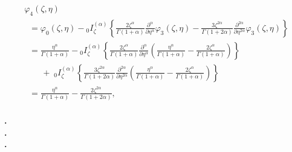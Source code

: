 \documentclass[10pt]{NSP1}
\begin{document}
\begin{equation}
\label{eq41}
\begin{array}{llllll}
 \varphi _4 \left( {\zeta ,\eta } \right) \\
\;\; =\varphi _0 \left( {\zeta ,\eta } \right)-{ }_0I_\zeta ^{\left( \alpha
\right)}\left\{ {\frac{2\zeta ^\alpha }{\Gamma \left( {1+\alpha }
\right)}\frac{\partial ^\alpha }{\partial \eta ^\alpha }\varphi _3 \left(
{\zeta ,\eta } \right)-\frac{3\zeta ^{2\alpha }}{\Gamma \left( {1+2\alpha }
\right)}\frac{\partial ^{2\alpha }}{\partial \eta ^{2\alpha }}\varphi _3
\left( {\zeta ,\eta } \right)} \right\} \\
\;\; =\frac{\eta ^\alpha }{\Gamma \left( {1+\alpha } \right)}-{ }_0I_\zeta
^{\left( \alpha \right)}\left\{ {\frac{2\zeta ^\alpha }{\Gamma \left(
{1+\alpha } \right)}\frac{\partial ^\alpha }{\partial \eta ^\alpha }\left(
{\frac{\eta ^\alpha }{\Gamma \left( {1+\alpha } \right)}-\frac{2\zeta
^\alpha }{\Gamma \left( {1+\alpha } \right)}} \right)} \right\} \\
\qquad +\;_0I_\zeta ^{\left( \alpha \right)}\left\{ {\frac{3\zeta ^{2\alpha
}}{\Gamma \left( {1+2\alpha } \right)}\frac{\partial ^{2\alpha }}{\partial
\eta ^{2\alpha }}\left( {\frac{\eta ^\alpha }{\Gamma \left( {1+\alpha }
\right)}-\frac{2\zeta ^\alpha }{\Gamma \left( {1+\alpha } \right)}} \right)}
\right\} \\
\;\; =\frac{\eta ^\alpha }{\Gamma \left( {1+\alpha } \right)}-\frac{2\zeta
^{2\alpha }}{\Gamma \left( {1+2\alpha } \right)},\\
 \end{array}
\end{equation}

\begin{center}
{\bf\large .}\\
{\bf\large .}\\
{\bf\large .}\\
\end{center}
\end{document}
